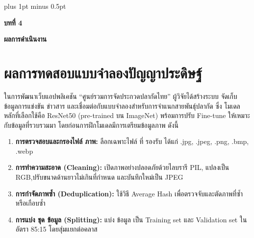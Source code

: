
\clearpage
\thispagestyle{empty}

\begingroup
\fontsize{16pt}{19.2pt}\selectfont
\justifying
\XeTeXlinebreakskip=0pt plus 1pt minus 0.5pt
\setlength{\parindent}{1.5cm}
\setlength{\parskip}{0pt}

{}
\begin{center}
	{\bfseries\fontsize{18pt}{21.6pt}\selectfont บทที่ 4}
\end{center}

\vspace{\baselineskip}

\begin{center}
	{\bfseries\fontsize{18pt}{21.6pt}\selectfont ผลการดำเนินงาน}
\end{center}

\vspace{\baselineskip}

\section*{ผลการทดสอบแบบจำลองปัญญาประดิษฐ์}

\indent ในการพัฒนาเว็บแอปพลิเคชัน “ศูนย์รวมการจัดประกวดปลากัดไทย” ผู้วิจัยได้สร้างระบบ
จัดเก็บข้อมูลการแข่งขัน ข่าวสาร และเชื่อมต่อกับแบบจำลองสำหรับการจำแนกสายพันธุ์ปลากัด ซึ่ง
โมเดลหลักที่เลือกใช้คือ ResNet50 (pre-trained บน ImageNet) พร้อมการปรับ Fine-tune
ให้เหมาะกับข้อมูลที่รวบรวมมา โดยก่อนการฝึกโมเดลมีการเตรียมข้อมูลภาพ ดังนี้

\begin{sloppypar}
	\begin{enumerate} %
		\item \textbf{การตรวจสอบและกรองไฟล์ ภาพ:} ลือกเฉพาะไฟล์ ที่ รองรับ ได้แก่ .jpg, .jpeg, .png, .bmp,
		.webp
		\item \textbf{การทำความสะอาด (Cleaning):} เปิดภาพอย่างปลอดภัยด้วยไลบรารี PIL, แปลงเป็น RGB,ปรับขนาดด้านยาวไม่เกินที่กำหนด และบันทึกใหม่เป็น JPEG
		\item \textbf{การกำจัดภาพซ้ำ (Deduplication):} ใช้วิธี Average Hash เพื่อตรวจจับและตัดภาพที่ซ้ำหรือเกือบซ้ำ
		\item \textbf{การแบ่ง ชุด ข้อมูล (Splitting):} แบ่ง ข้อมูล เป็น Training set และ Validation set ในอัตรา 85:15 โดยสุ่มแยกต่อคลาส
	\end{enumerate}
\end{sloppypar}

